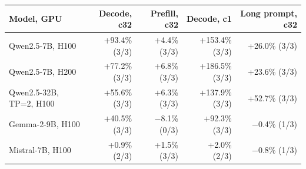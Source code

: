 \begin{tabular}{lrrrr}
\toprule
Model, GPU & Decode, c32 & Prefill, c32 & Decode, c1 & Long prompt, c32 \\
\midrule
Qwen2.5-7B, H100 & +93.4\% (3/3) & +4.4\% (3/3) & +153.4\% (3/3) & +26.0\% (3/3) \\
Qwen2.5-7B, H200 & +77.2\% (3/3) & +6.8\% (3/3) & +186.5\% (3/3) & +23.6\% (3/3) \\
Qwen2.5-32B, TP=2, H100 & +55.6\% (3/3) & +6.3\% (3/3) & +137.9\% (3/3) & +52.7\% (3/3) \\
Gemma-2-9B, H100 & +40.5\% (3/3) & $-$8.1\% (0/3) & +92.3\% (3/3) & $-$0.4\% (1/3) \\
Mistral-7B, H100 & +0.9\% (2/3) & +1.5\% (3/3) & +2.0\% (2/3) & $-$0.8\% (1/3) \\
\bottomrule
\end{tabular}
